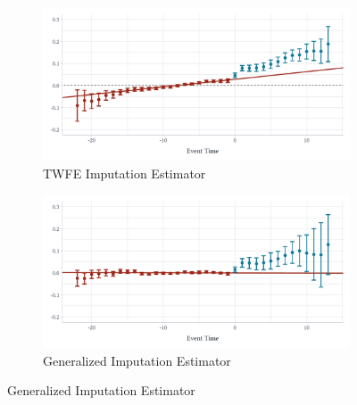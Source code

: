 \documentclass[12pt]{article}
\begin{document}
\begin{figure}
\caption{Effect of Walmart on County $\log$ Retail Employment}
\label{fig:walmart_retail}

\begin{center}
\begin{subfigure}[b]{0.75\textwidth}


  \caption{TWFE Imputation Estimator}
  \begin{adjustbox}{width=\textwidth, center}
    \includegraphics{figures/Walmart/did2s_retail.pdf}
  \end{adjustbox}
\end{subfigure}
\end{center}
\begin{center}
\begin{subfigure}[b]{0.75\textwidth}
  \caption{Generalized Imputation Estimator}
  \begin{adjustbox}{width=\textwidth, center}
    \includegraphics{figures/Walmart/qld_retail.pdf}
  \end{adjustbox}
\end{subfigure}
\end{center}


\end{figure}
\end{document}
